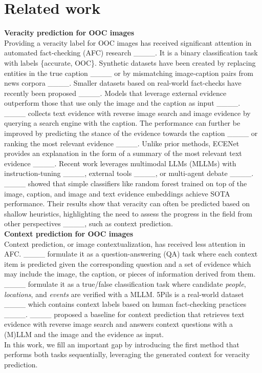 \section{Related work}
\textbf{Veracity prediction for OOC images}\\
Providing a veracity label for OOC images has received significant attention in automated fact-checking (AFC) research ____. It is a binary classification task with labels \{accurate, OOC\}. Synthetic datasets have been created by replacing entities in the true caption ____   or by mismatching image-caption pairs from news corpora  ____. 
Smaller datasets based on real-world fact-checks have recently been proposed ____. Models that leverage external evidence outperform those that use only the image and the caption as input ____. ____ collects text evidence with reverse image search and image evidence by querying a search engine with the caption. The performance can further be improved by predicting the stance of the evidence towards the caption ____ or ranking the most relevant evidence ____. Unlike prior methods, ECENet provides an explanation in the form of a summary of the most relevant text evidence ____. Recent work leverages multimodal LLMs (MLLMs) with instruction-tuning ____, external tools ____, or multi-agent debate ____.  
____ showed that simple classifiers like random forest trained on top of the image, caption, and image and text evidence embeddings achieve SOTA performance. Their results show that veracity can often be predicted based on shallow heuristics, highlighting the need to assess the progress in the field from other perspectives ____, such as context prediction.\\

\noindent \textbf{Context prediction for OOC images}\\
Context prediction, or image contextualization, has received less attention in AFC. ____ formulate it as a question-answering (QA) task where each context item is predicted given the corresponding question and a set of evidence which may include the image, the caption, or pieces of information derived from them. ____ formulate it as a true/false classification task where candidate \textit{people}, \textit{locations}, and \textit{events} are verified with a MLLM. 5Pils is a real-world dataset ____ which  contains context labels based on human fact-checking practices ____. ____ proposed a baseline for context prediction that retrieves text evidence with reverse image search and answers context questions with a (M)LLM and the image and the evidence as input.\\


In this work, we fill an important gap by introducing the first method that performs both tasks sequentially, leveraging the generated context for veracity prediction.